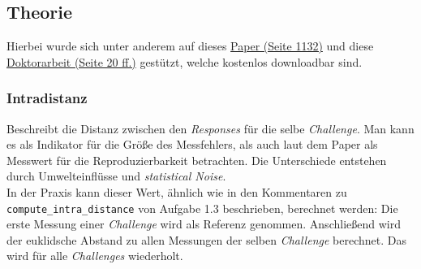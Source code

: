 \subsection{Theorie}

Hierbei wurde sich unter anderem auf dieses 
\href{https://ieeexplore.ieee.org/stamp/%
stamp.jsp?tp=&arnumber=6823677} %
{Paper (Seite 1132)} %
und diese 
\href{https://limo.libis.be/primo-explore/%
fulldisplay?docid=LIRIAS1662210&context%
=L&vid=Lirias&search_scope=Lirias&tab%
=default_tab&lang=en_US&fromSitemap=1}
{Doktorarbeit (Seite 20 ff.)}
gestützt, welche kostenlos downloadbar sind.

\subsubsection*{Intradistanz}
\begin{comment}
VL 5, Folie 36:
Distance between responses for the same challenges. 
Shows measurements error


Doktorarbeit, S.20:
A PUF response intra-distance is a random variable
describing the distance between two PUF responses 
from the same PUF instance and using
the same challenge

Paper, S. 1132:
Intra-PUF variation: Defined as the number of bits
in a PUF response that vary when an identical
challenge is repeatedly queried on a given PUF
device in a changing environment. This variation is
due to this environmental change as well as 
statistical noise. As a result, it is commonly 
represented in the form of a statistical 
distribution. Intra-PUF variation is a measure of 
the reproducibility of responses from an individual 
PUF circuit.
\end{comment}

Beschreibt die Distanz zwischen den
\textit{Responses} für die selbe \textit{Challenge}. 
Man kann es als Indikator für die Größe des Messfehlers,
als auch laut dem Paper als Messwert für die 
Reproduzierbarkeit betrachten. Die Unterschiede entstehen 
durch Umwelteinflüsse und \textit{statistical Noise}.\\

In der Praxis kann dieser Wert, ähnlich wie in 
den Kommentaren zu \verb|compute_intra_distance| 
von Aufgabe 1.3 beschrieben, berechnet werden: Die
erste Messung einer \textit{Challenge} wird als Referenz 
genommen. Anschließend wird der euklidsche Abstand zu 
allen Messungen der selben \textit{Challenge} berechnet.
Das wird für alle \textit{Challenges} wiederholt.


